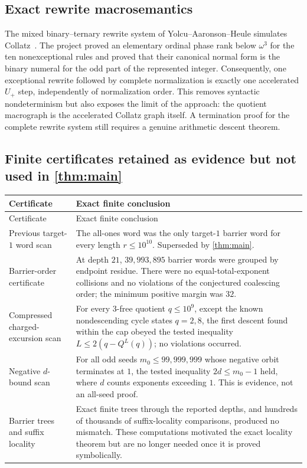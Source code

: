 \documentclass[11pt]{article}
\theoremstyle{definition}
\theoremstyle{remark}
\newcommand{\Up}{U_{+}}
\begin{document}
\subsection{Exact rewrite macrosemantics}

The mixed binary--ternary rewrite system of
Yolcu--Aaronson--Heule simulates Collatz~\cite{YolcuAaronsonHeule2023}.
The project proved an elementary ordinal phase rank below $\omega^3$ for the
ten nonexceptional rules and proved that their canonical normal form is the
binary numeral for the odd part of the represented integer.  Consequently,
one exceptional rewrite followed by complete normalization is exactly one
accelerated $\Up$ step, independently of normalization order.  This removes
syntactic nondeterminism but also exposes the limit of the approach: the
quotient macrograph is the accelerated Collatz graph itself.  A termination
proof for the complete rewrite system still requires a genuine arithmetic
descent theorem.

\subsection{Finite certificates retained as evidence but not used in
\cref{thm:main}}

\begin{longtable}{@{}p{}p{}@{}}
\toprule
Certificate & Exact finite conclusion\\
\midrule
\endfirsthead
\toprule
Certificate & Exact finite conclusion\\
\midrule
\endhead
Previous target-$1$ word scan & The all-ones word was the only target-$1$ barrier word for every length $r\le10^{10}$.  Superseded by \cref{thm:main}.\\
Barrier-order certificate & At depth $21$, $39{,}993{,}895$ barrier words were grouped by endpoint residue.  There were no equal-total-exponent collisions and no violations of the conjectured coalescing order; the minimum positive margin was $32$.\\
Compressed charged-excursion scan & For every $3$-free quotient $q\le10^9$, except the known nondescending cycle states $q=2,8$, the first descent found within the cap obeyed the tested inequality $L\le2(q-Q^L(q))$; no violations occurred.\\
Negative $d$-bound scan & For all odd seeds $m_0\le99{,}999{,}999$ whose negative orbit terminates at $1$, the tested inequality $2d\le m_0-1$ held, where $d$ counts exponents exceeding $1$.  This is evidence, not an all-seed proof.\\
Barrier trees and suffix locality & Exact finite trees through the reported depths, and hundreds of thousands of suffix-locality comparisons, produced no mismatch.  These computations motivated the exact locality theorem but are no longer needed once it is proved symbolically.\\
\bottomrule
\end{longtable}
\end{document}
